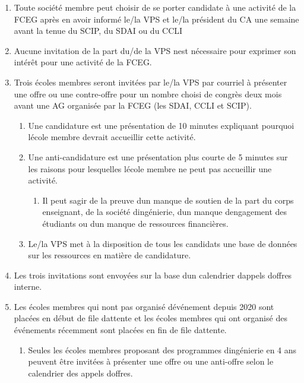 \begin{enumerate}
 \item
  Toute société membre peut choisir de se porter candidate à une activité de la FCEG après en avoir informé le/la VPS et le/la président du CA une semaine avant la tenue du SCIP, du SDAI ou du CCLI
 \item
  Aucune invitation de la part du/de la VPS n\textquotesingle est nécessaire pour exprimer son intérêt pour une activité de la FCEG.
 \item
  Trois écoles membres seront invitées par le/la VPS par courriel à présenter une offre ou une contre-offre pour un nombre choisi de congrès deux mois avant une AG organisée par la FCEG (les SDAI, CCLI et SCIP).

  \begin{enumerate}
   \item
    Une candidature est une présentation de 10 minutes expliquant pourquoi l\textquotesingle école membre devrait accueillir cette activité.
   \item
    Une anti-candidature est une présentation plus courte de 5 minutes sur les raisons pour lesquelles l\textquotesingle école membre ne peut pas accueillir une activité.

    \begin{enumerate}
     \item
      Il peut s\textquotesingle agir de la preuve d\textquotesingle un manque de soutien de la part du corps enseignant, de la société d\textquotesingle ingénierie, d\textquotesingle un manque d\textquotesingle engagement des étudiants ou d\textquotesingle un manque de ressources financières.
    \end{enumerate}
   \item
    Le/la VPS met à la disposition de tous les candidats une base de données sur les ressources en matière de candidature.
  \end{enumerate}
 \item
  Les trois invitations sont envoyées sur la base d\textquotesingle un calendrier d\textquotesingle appels d\textquotesingle offres interne.
 \item
  Les écoles membres qui n\textquotesingle ont pas organisé d\textquotesingle événement depuis 2020 sont placées en début de file d\textquotesingle attente et les écoles membres qui ont organisé des événements récemment sont placées en fin de file d\textquotesingle attente.

  \begin{enumerate}
   \item
    Seules les écoles membres proposant des programmes d\textquotesingle ingénierie en 4 ans peuvent être invitées à présenter une offre ou une anti-offre selon le calendrier des appels d\textquotesingle offres.
  \end{enumerate}
\end{enumerate}

